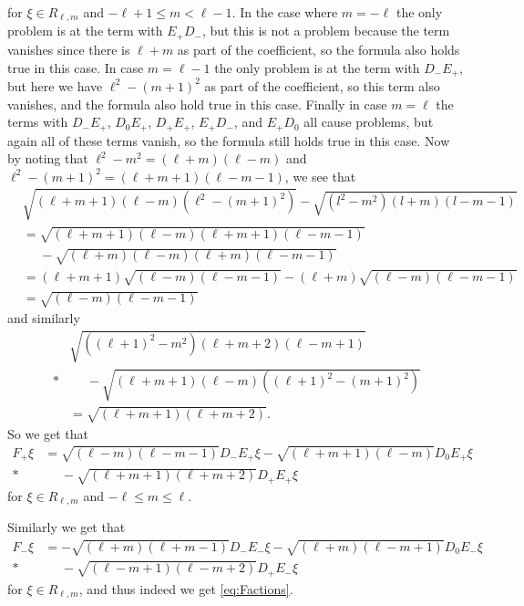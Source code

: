 for $\xi\in R_{\ell,m}$ and $-\ell+1 \leq m < \ell-1$. In the case where $m=-\ell$ the only problem is at the term with $E_+D_-$, but this is not a problem because the term vanishes since there is $\ell+m$ as part of the coefficient, so the formula also holds true in this case. In case $m=\ell-1$ the only problem is at the term with $D_-E_+$, but here we have $\ell^2-(m+1)^2$ as part of the coefficient, so this term also vanishes, and the formula also hold true in this case. Finally in case $m=\ell$ the terms with $D_-E_+$, $D_0E_+$, $D_+E_+$, $E_+D_-$, and $E_+D_0$ all cause problems, but again all of these terms vanish, so the formula still holds true in this case. Now by noting that $\ell^2-m^2=(\ell+m)(\ell-m)$ and $\ell^2-(m+1)^2=(\ell+m+1)(\ell-m-1)$, we see that
\begin{align*}
  &\sqrt{(\ell+m+1)(\ell-m)(\ell^2-(m+1)^2)} - \sqrt{(l^2-m^2)(l+m)(l-m-1)} \\
  &=\sqrt{(\ell+m+1)(\ell-m)(\ell+m+1)(\ell-m-1)} \\
  &\phantom{{}={}}{} - \sqrt{(\ell+m)(\ell-m)(\ell+m)(\ell-m-1)} \\
  &= (\ell+m+1)\sqrt{(\ell-m)(\ell-m-1)} - (\ell+m)\sqrt{(\ell-m)(\ell-m-1)} \\
  &= \sqrt{(\ell-m)(\ell-m-1)}
\end{align*}
and similarly
\begin{align*}
  &\sqrt{((\ell+1)^2-m^2)(\ell+m+2)(\ell-m+1)} \\*
  &\phantom{{}={}}{} - \sqrt{(\ell+m+1)(\ell-m)((\ell+1)^2-(m+1)^2)} \\
  &= \sqrt{(\ell+m+1)(\ell+m+2)}.
\end{align*}
So we get that
\begin{align*}
  F_+ \xi &= \sqrt{(\ell-m)(\ell-m-1)} D_-E_+ \xi - \sqrt{(\ell+m+1)(\ell-m)} D_0E_+\xi \\*
  &\phantom{{}={}}{} - \sqrt{(\ell+m+1)(\ell+m+2)} D_+E_+\xi
\end{align*}
for $\xi\in R_{\ell,m}$ and $-\ell \leq m \leq \ell$.

Similarly we get that
\begin{align*}
  F_- \xi &= -\sqrt{(\ell+m)(\ell+m-1)} D_-E_- \xi - \sqrt{(\ell+m)(\ell-m+1)} D_0E_- \xi \\*
  &\phantom{{}={}}{} - \sqrt{(\ell-m+1)(\ell-m+2)} D_+E_- \xi
\end{align*}
for $\xi\in R_{\ell,m}$, and thus indeed we get \cref{eq:Factions}. 

